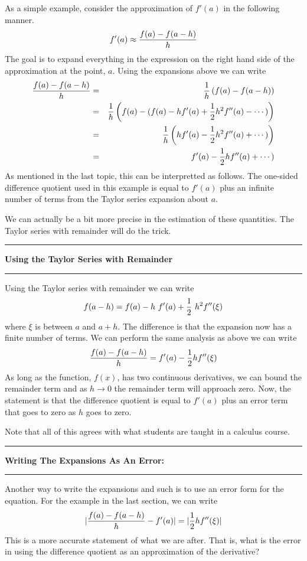 \documentclass[10pt,fleqn]{article}
\begin{document}
As a simple example, consider the approximation of \(f'(a)\) in the following
manner.
\[
  f'(a) \approx {{f(a)-f(a-h)}\over{h}}
\]
The goal is to expand everything in the expression on the right hand side of the
approximation at the point, \(a\). Using the expansions above we can write
\begin{eqnarray*}
  {{f(a)-f(a-h)}\over{h}} & = & {1\over h} \left( f(a)-f(a-h) \right) \\
       & = & {1\over h}
        \left( f(a)-( f(a) - h f'(a)
               + {1\over 2} h^2 f''(a) - \cdots ) \right) \\
       & = & {1\over h}
        \left( h f'(a) - {1\over 2} h^2 f''(a) + \cdots ) \right) \\
       & = & f'(a) - {1\over 2} h f''(a) + \cdots ) 
\end{eqnarray*}
As mentioned in the last topic, this can be interpretted as follows. The
one-sided difference quotient used in this example is equal to \(f'(a)\) plus
an infinite number of terms from the Taylor series expansion about \(a\).

We can actually be a bit more precise in the estimation of these quantities. The
Taylor series with remainder will do the trick.
\vskip0.1in\hrule\vskip0.1in \noindent
{\bf Using the Taylor Series with Remainder}
\vskip0.1in\hrule\vskip0.1in \noindent
Using the Taylor series with remainder we can write
\[
  f(a-h) = f(a) - h\ f'(a) + {1\over 2}\ h^2 f''(\xi)
\]
where \(\xi\) is between \(a\) and \(a+h\). The difference is that the expansion
now has a finite number of terms. We can perform the same analysis as above we
can write
\[
  {{f(a)-f(a-h)}\over{h}} = f'(a) - {1\over 2} h f''(\xi)
\]
As long as the function, \(f(x)\), has two continuous derivatives, we can bound
the remainder term and as \(h\rightarrow 0\) the remainder term will approach
zero. Now, the statement is that the difference quotient is equal to \(f'(a)\)
plus an error term that goes to zero as \(h\) goes to zero.

Note that all of this agrees with what students are taught in a calculus course.
\vskip0.1in\hrule\vskip0.1in \noindent
{\bf Writing The Expansions As An Error:}
\vskip0.1in\hrule\vskip0.1in \noindent
Another way to write the expansions and such is to use an error form for the
equation. For the example in the last section, we can write
\[
  | {{f(a)-f(a-h)}\over{h}} - f'(a) | = | {1\over 2} h f''(\xi) |
\]
This is a more accurate statement of what we are after. That is, what is the
error in using the difference quotient as an approximation of the derivative?
\end{document}
